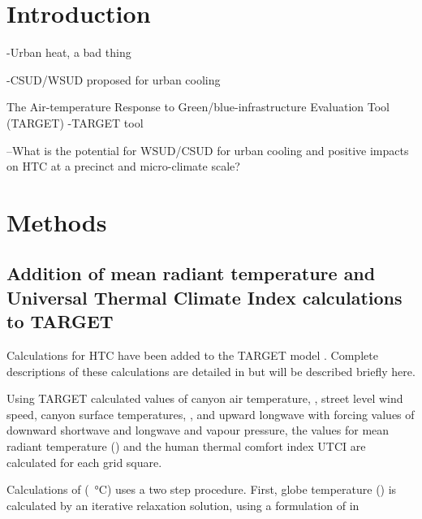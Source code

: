 \documentclass[final,3p,times,authoryear]{elsarticle}
\begin{document}
\section{Introduction}\label{sec:introduction}

-Urban heat, a bad thing

-CSUD/WSUD proposed for urban cooling

The Air-temperature Response to Green/blue-infrastructure Evaluation Tool (TARGET)
-TARGET tool
\citep{Broadbent2018}

--What is the potential for WSUD/CSUD for urban cooling and positive impacts on HTC at a precinct and micro-climate scale?




\section{Methods}\label{sec:Methods}



\subsection{Addition of mean radiant temperature and Universal Thermal Climate Index calculations to TARGET}\label{sec:tmrtutci}

Calculations for HTC have been added to the TARGET model \citep{Broadbent2018}. Complete descriptions of these calculations are detailed in \cite{Nice2018} but will be described briefly here.

Using TARGET calculated values of canyon air temperature, , street level wind speed, canyon surface temperatures, , and upward longwave with forcing values of downward shortwave and longwave and vapour pressure, the values for mean radiant temperature () and the human thermal comfort index UTCI are calculated for each grid square.

Calculations of  (\SI{}{\degreeCelsius}) uses a two step procedure. First, globe temperature () is calculated by an iterative relaxation solution, using a formulation of \cite{Liljegren2008} in  
\end{document}
